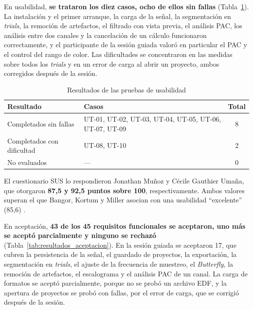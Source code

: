 \documentclass[12pt,letterpaper,oneside]{article}
\begin{document}
En usabilidad, \textbf{se trataron los diez casos, ocho de ellos sin fallas} (Tabla~\ref{tab:resultados_usabilidad}). La instalación y el primer arranque, la carga de la señal, la segmentación en \textit{trials}, la remoción de artefactos, el filtrado con vista previa, el análisis PAC, los análisis entre dos canales y la cancelación de un cálculo funcionaron correctamente, y el participante de la sesión guiada valoró en particular el PAC y el control del rango de color. Las dificultades se concentraron en las medidas sobre todos los \textit{trials} y en un error de carga al abrir un proyecto, ambos corregidos después de la sesión.

\begin{table}[H]
\centering
\scriptsize
\renewcommand{\arraystretch}{1.3}
\begin{tabularx}{\textwidth}{|>{\raggedright\arraybackslash}X|>{\raggedright\arraybackslash}X|c|}
\hline
\textbf{Resultado} & \textbf{Casos} & \textbf{Total} \\
\hline
Completados sin fallas & UT-01, UT-02, UT-03, UT-04, UT-05, UT-06, UT-07, UT-09 & 8 \\
\hline
Completados con dificultad & UT-08, UT-10 & 2 \\
\hline
No evaluados & --- & 0 \\
\hline
\end{tabularx}
\caption{Resultados de las pruebas de usabilidad}
\label{tab:resultados_usabilidad}
\end{table}

El cuestionario SUS lo respondieron Jonathan Muñoz y Cécile Gauthier Umaña, que otorgaron \textbf{87,5 y 92,5 puntos sobre 100}, respectivamente. Ambos valores superan el que Bangor, Kortum y Miller asocian con una usabilidad ``excelente'' (85,6) \cite{bangor2009}.

En aceptación, \textbf{43 de los 45 requisitos funcionales se aceptaron, uno más se aceptó parcialmente y ninguno se rechazó} (Tabla~\ref{tab:resultados_aceptacion}). En la sesión guiada se aceptaron 17, que cubren la persistencia de la señal, el guardado de proyectos, la exportación, la segmentación en \textit{trials}, el ajuste de la frecuencia de muestreo, el \textit{Butterfly}, la remoción de artefactos, el escalograma y el análisis PAC de un canal. La carga de formatos se aceptó parcialmente, porque no se probó un archivo EDF, y la apertura de proyectos se probó con fallas, por el error de carga, que se corrigió después de la sesión.
\end{document}
